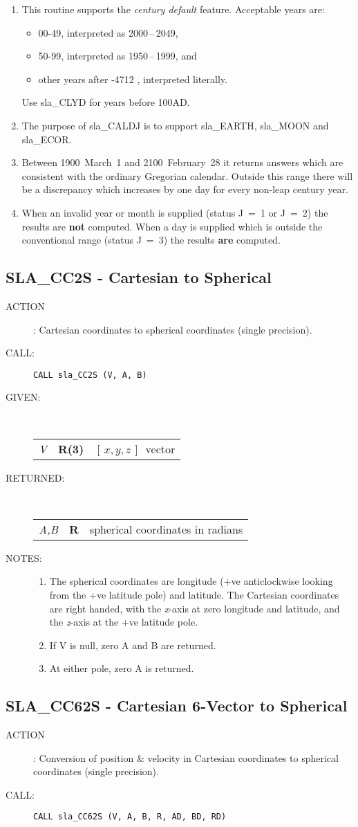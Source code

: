 \documentclass[11pt,twoside]{article}
\newcommand{\xlabel}[1]{}
\newcommand{\xyz}       {$[\,x,y,z\,]$}
\newcommand{\routine}[3]
{\hbadness=10000
  \vbox
  {
    \rule{\textwidth}{0.3mm}\\
    {\Large {\bf #1} \hfill #2 \hfill {\bf #1}}\\
    \setlength{\oldspacing}{\topsep}
    \setlength{\topsep}{0.3ex}
    \begin{description}
      #3
    \end{description}
    \setlength{\topsep}{\oldspacing}
  }
}
\renewcommand{\routine}[3]
   {
      \subsection{#1\xlabel{#1} - #2\label{#1}}
       \begin{description}
         #3
       \end{description}
   }
\newcommand{\action}[1]
{\item[ACTION]: #1}
\newcommand{\action}[1]
   {\item[ACTION:] #1}
\newcommand{\call}[1]
{\item[CALL]: \hspace{0.4em}{\tt #1}}
\newlength{\oldspacing}
\renewcommand{\call}[1]
   {
    \item[CALL:] {\tt #1}
   }
\newcommand{\args}[2]
{
  \goodbreak
  \setlength{\oldspacing}{\topsep}
  \setlength{\topsep}{0.3ex}
  \begin{description}
  \item[#1]:\\[1.5ex]
    \begin{tabular}{p{7em}p{6em}p{22em}}
      #2
    \end{tabular}
  \end{description}
  \setlength{\topsep}{\oldspacing}
}
\renewcommand{\args}[2]
   {
     \begin{description}
        \item[#1:]\\
        \begin{tabular}{p{7em}p{6em}l}
           #2
        \end{tabular}
     \end{description}
   }
\newcommand{\spec}[3]
{
  {\em {#1}} & {\bf \mbox{#2}} & {#3}
}
\newcommand{\notes}[1]
{
  \goodbreak
  \setlength{\oldspacing}{\topsep}
  \setlength{\topsep}{0.3ex}
  \begin{description}
    \item[NOTES]:
        #1
  \end{description}
  \setlength{\topsep}{\oldspacing}
}
\renewcommand{\notes}[1]
   {
      \begin{description}
         \item[NOTES:]
            #1
      \end{description}
   }
\begin{document}
{
 \begin{enumerate}
  \item This routine supports the {\it century default}\/ feature.
        Acceptable years are:
        \begin{itemize}
         \item 00-49, interpreted as 2000\,--\,2049,
         \item 50-99, interpreted as 1950\,--\,1999, and
         \item other years after -4712 , interpreted literally.
        \end{itemize}
        Use sla\_CLYD for years before 100AD.
  \item The purpose of sla\_CALDJ is to support
        sla\_EARTH, sla\_MOON and sla\_ECOR.
  \item Between 1900~March~1 and 2100~February~28 it returns answers
        which are consistent with the ordinary Gregorian calendar.
        Outside this range there will be a discrepancy which increases
        by one day for every non-leap century year.
  \item When an invalid year or month is supplied (status J~=~1 or J~=~2)
        the results are {\bf not} computed.  When a day is
        supplied which is outside the conventional range (status J~=~3)
        the results {\bf are} computed.
 \end{enumerate}
}
\routine{SLA\_CC2S}{Cartesian to Spherical}
{
 \action{Cartesian coordinates to spherical coordinates (single precision).}
 \call{CALL sla\_CC2S (V, A, B)}
}
\args{GIVEN}
{
 \spec{V}{R(3)}{\xyz\ vector}
}
\args{RETURNED}
{
 \spec{A,B}{R}{spherical coordinates in radians}
}
\notes
{
 \begin{enumerate}
  \item The spherical coordinates are longitude (+ve anticlockwise
        looking from the +ve latitude pole) and latitude.  The
        Cartesian coordinates are right handed, with the {\it x}-axis
        at zero longitude and latitude, and the {\it z}-axis at the
        +ve latitude pole.
  \item If V is null, zero A and B are returned.
  \item At either pole, zero A is returned.
 \end{enumerate}
}
\routine{SLA\_CC62S}{Cartesian 6-Vector to Spherical}
{
 \action{Conversion of position \& velocity in Cartesian coordinates
         to spherical coordinates (single precision).}
 \call{CALL sla\_CC62S (V, A, B, R, AD, BD, RD)}
}
\end{document}
